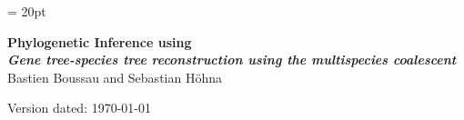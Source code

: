 \documentclass[11pt]{article}
\begin{document}
\renewcommand{\headrulewidth}{0.5pt}
\headsep = 20pt
\lhead{ }

\thispagestyle{plain}
\begin{center}

\textbf{\LARGE Phylogenetic Inference using \RevBayes}\\\vspace{2mm}
\textbf{\it{\Large Gene tree-species tree reconstruction using the multispecies coalescent}}\\\vspace{2mm}
\vspace{1cm}
{\Large Bastien Boussau and Sebastian H{\"o}hna}
\vspace{1cm}
\end{center}

\def \ResourcePath {./}
\def \GlobalResourcePath {../}



Version dated: \today
\end{document}
